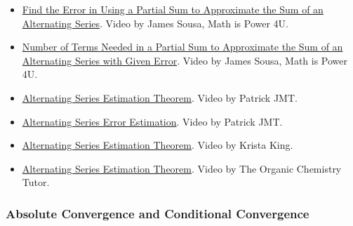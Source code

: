 \begin{itemize}

\item \href{https://www.youtube.com/watch?v=oZ3PKvQKffE}{Find the Error in Using a Partial Sum to Approximate the Sum of an Alternating Series}. 
Video by James Sousa, Math is Power 4U.

\item \href{https://www.youtube.com/watch?v=_hWa3INOo-Y}{Number of Terms Needed in a Partial Sum to Approximate the Sum of an Alternating Series with Given Error}. 
Video by James Sousa, Math is Power 4U.

\item \href{https://www.youtube.com/watch?v=ilRkVcAxdCo}{Alternating Series Estimation Theorem}. 
Video by Patrick JMT.

\item \href{https://www.youtube.com/watch?v=BNEULxileT8}{Alternating Series Error Estimation}. 
Video by Patrick JMT.

\item \href{https://www.youtube.com/watch?v=H8lHvQashkE}{Alternating Series Estimation Theorem}. 
Video by Krista King.

\item \href{https://www.youtube.com/watch?v=FkUrAgBzAZo}{Alternating Series Estimation Theorem}. 
Video by The Organic Chemistry Tutor.

\end{itemize}

\subsubsection{Absolute Convergence and Conditional Convergence}
\label{sss:abso-c62f}

